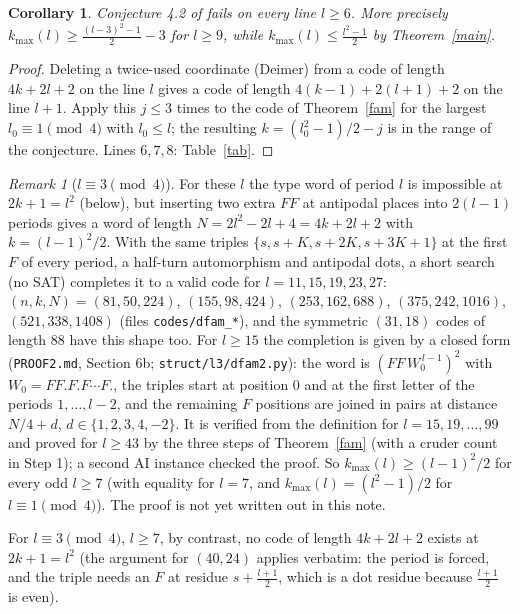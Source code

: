 \documentclass[11pt]{article}
\newtheorem{corollary}{Corollary}
\theoremstyle{remark}
\newtheorem{remark}{Remark}
\begin{document}
\begin{corollary}
Conjecture 4.2 of \cite{B2} fails on every line $l\ge 6$. More precisely $k_{\max}(l)\ge \tfrac{(l-3)^2-1}{2}-3$ for $l\ge 9$, while $k_{\max}(l)\le\tfrac{l^2-1}{2}$ by Theorem~\ref{main}.
\end{corollary}
\begin{proof}
Deleting a twice-used coordinate (Deimer) from a code of length $4k+2l+2$ on the line $l$ gives a code of length $4(k-1)+2(l+1)+2$ on the line $l+1$.
Apply this $j\le 3$ times to the code of Theorem~\ref{fam} for the largest $l_0\equiv 1\pmod 4$ with $l_0\le l$; the resulting $k=(l_0^2-1)/2-j$ is in the range of the conjecture.
Lines $6,7,8$: Table~\ref{tab}.
\end{proof}
\begin{remark}[$l\equiv 3 \pmod 4$]
For these $l$ the type word of period $l$ is impossible at $2k+1=l^2$ (below), but inserting two extra $FF$ at antipodal places into
$2(l-1)$ periods gives a word of length $N=2l^2-2l+4=4k+2l+2$ with $k=(l-1)^2/2$. With the same triples $\{s,s+K,s+2K,s+3K+1\}$ at the
first $F$ of every period, a half-turn automorphism and antipodal dots, a short search (no SAT) completes it to a valid code for
$l=11,15,19,23,27$: $(n,k,N)=(81,50,224)$, $(155,98,424)$, $(253,162,688)$, $(375,242,1016)$, $(521,338,1408)$ (files \texttt{codes/dfam\_*}),
and the symmetric $(31,18)$ codes of length $88$ have this shape too. For $l\ge 15$ the completion is given by a closed form (\texttt{PROOF2.md}, Section 6b; \texttt{struct/l3/dfam2.py}):
the word is $(FF\,W_0^{\,l-1})^2$ with $W_0=FF.F.F\cdots F.$, the triples start at position $0$ and at the first letter of the periods $1,\dots,l-2$,
and the remaining $F$ positions are joined in pairs at distance $N/4+d$, $d\in\{1,2,3,4,-2\}$. It is verified from the definition for
$l=15,19,\dots,99$ and proved for $l\ge 43$ by the three steps of Theorem~\ref{fam} (with a cruder count in Step 1); a second AI instance
checked the proof. So $k_{\max}(l)\ge (l-1)^2/2$ for every odd $l\ge 7$ (with equality for $l=7$, and $k_{\max}(l)=(l^2-1)/2$ for $l\equiv 1\pmod 4$).
The proof is not yet written out in this note.
\end{remark}
For $l\equiv 3 \pmod 4$, $l\ge 7$, by contrast, no code of length $4k+2l+2$ exists at $2k+1=l^2$ (the argument for $(40,24)$ applies verbatim:
the period is forced, and the triple needs an $F$ at residue $s+\tfrac{l+1}{2}$, which is a dot residue because $\tfrac{l+1}{2}$ is even).
\end{document}
